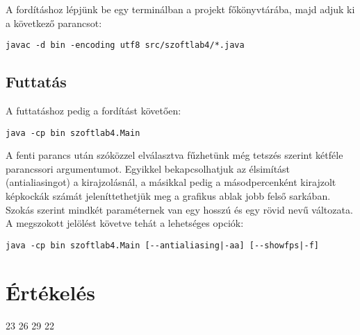 A fordításhoz lépjünk be egy terminálban a projekt főkönyvtárába, majd adjuk ki a következő parancsot:
\lstset{escapeinside=`', xleftmargin=10pt, frame=single, basicstyle=\ttfamily\footnotesize, language=sh}
\begin{lstlisting}
javac -d bin -encoding utf8 src/szoftlab4/*.java
\end{lstlisting}

\subsection{Futtatás}
A futtatáshoz pedig a fordítást követően:
\lstset{escapeinside=`', xleftmargin=10pt, frame=single, basicstyle=\ttfamily\footnotesize, language=sh}
\begin{lstlisting}
java -cp bin szoftlab4.Main
\end{lstlisting}

A fenti parancs után szóközzel elválasztva fűzhetünk még tetszés szerint kétféle parancssori argumentumot.
Egyikkel bekapcsolhatjuk az élsimítást (antialiasingot) a kirajzolásnál, a másikkal pedig a másodpercenként kirajzolt képkockák számát jeleníttethetjük meg a grafikus ablak jobb felső sarkában. Szokás szerint mindkét paraméternek van egy hosszú és egy rövid nevű változata.\\

A megszokott jelölést követve tehát a lehetséges opciók:

\begin{lstlisting}
java -cp bin szoftlab4.Main [--antialiasing|-aa] [--showfps|-f]
\end{lstlisting}

\newpage

\section{Értékelés}

\begin{ertekeles}
{23}        %
{26}
{29}
{22}
\end{ertekeles}


